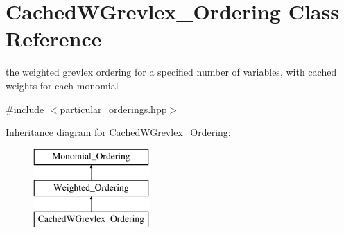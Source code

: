 \hypertarget{class_cached_w_grevlex___ordering}{}\section{Cached\+W\+Grevlex\+\_\+\+Ordering Class Reference}
\label{class_cached_w_grevlex___ordering}


the weighted grevlex ordering for a specified number of variables, with cached weights for each monomial  




{\ttfamily \#include $<$particular\+\_\+orderings.\+hpp$>$}

Inheritance diagram for Cached\+W\+Grevlex\+\_\+\+Ordering\+:\begin{figure}[H]
\begin{center}
\leavevmode
\includegraphics[height=3.000000cm]{class_cached_w_grevlex___ordering}
\end{center}
\end{figure}
